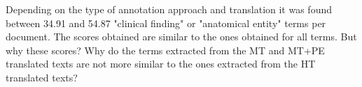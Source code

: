 Depending on the type of annotation approach and translation it was found between 34.91 and 54.87 "clinical finding" or "anatomical entity" terms per document. The scores obtained are similar to the ones obtained for all terms. But why these scores? Why do the terms extracted from the MT and MT+PE translated texts are not more similar to the ones extracted from the HT translated texts? 



%
%
%
%
%
%
%
%
